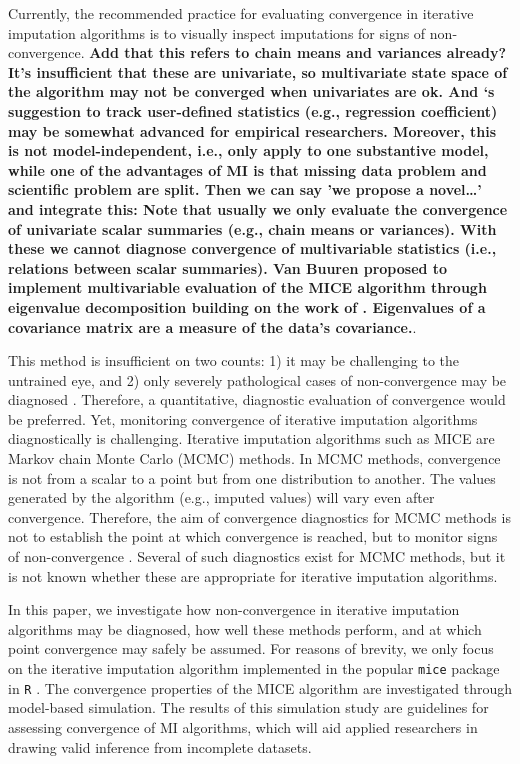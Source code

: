 \documentclass[Royal,times,sageh]{sagej}
\begin{document}
Currently, the recommended practice for evaluating convergence in
iterative imputation algorithms is to visually inspect imputations for
signs of non-convergence. \textbf{Add that this refers to chain means
and variances already? It's insufficient that these are univariate, so
multivariate state space of the algorithm may not be converged when
univariates are ok. And \citet{buur18}`s suggestion to track
user-defined statistics (e.g., regression coefficient) may be somewhat
advanced for empirical researchers. Moreover, this is not
model-independent, i.e., only apply to one substantive model, while one
of the advantages of MI is that missing data problem and scientific
problem are split. Then we can say 'we propose a novel\ldots{}' and
integrate this: Note that usually we only evaluate the convergence of
univariate scalar summaries (e.g., chain means or variances). With these
we cannot diagnose convergence of multivariable statistics (i.e.,
relations between scalar summaries). Van Buuren \citeyearpar[\(\S\)
4.5.2]{buur18} proposed to implement multivariable evaluation of the
MICE algorithm through eigenvalue decomposition building on the work of
\citet{mack03}. Eigenvalues of a covariance matrix are a measure of the
data's covariance.}.

This method is insufficient on two counts: 1) it may be challenging to
the untrained eye, and 2) only severely pathological cases of
non-convergence may be diagnosed \citep[\(\S\) 6.5.2]{buur18}.
Therefore, a quantitative, diagnostic evaluation of convergence would be
preferred. Yet, monitoring convergence of iterative imputation
algorithms diagnostically is challenging. Iterative imputation
algorithms such as MICE are Markov chain Monte Carlo (MCMC) methods. In
MCMC methods, convergence is not from a scalar to a point but from one
distribution to another. The values generated by the algorithm (e.g.,
imputed values) will vary even after convergence. Therefore, the aim of
convergence diagnostics for MCMC methods is not to establish the point
at which convergence is reached, but to monitor signs of non-convergence
\citep{hoff09}. Several of such diagnostics exist for MCMC methods, but
it is not known whether these are appropriate for iterative imputation
algorithms.

In this paper, we investigate how non-convergence in iterative
imputation algorithms may be diagnosed, how well these methods perform,
and at which point convergence may safely be assumed. For reasons of
brevity, we only focus on the iterative imputation algorithm implemented
in the popular \texttt{mice} package \citep{mice} in \texttt{R}
\citep{R}. The convergence properties of the MICE algorithm are
investigated through model-based simulation. The results of this
simulation study are guidelines for assessing convergence of MI
algorithms, which will aid applied researchers in drawing valid
inference from incomplete datasets.
\end{document}
